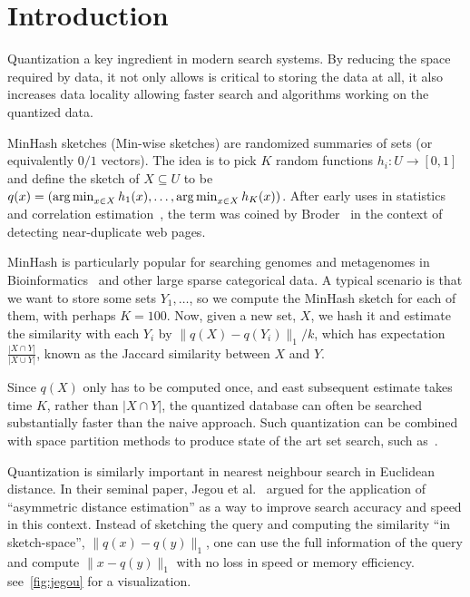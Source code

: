 
\section{Introduction}
Quantization a key ingredient in modern search systems.
By reducing the space required by data, it not only allows is critical to storing the data at all, it also increases data locality allowing faster search and algorithms working on the quantized data.

MinHash sketches (Min-wise sketches) are randomized summaries of sets (or equivalently $0/1$ vectors).
The idea is to pick $K$ random functions $h_i : U \to [0,1]$ and define the sketch of $X\subseteq U$ to be
$q(x) = (\operatorname*{arg\,min}_{x\in X}h_1(x), \dots, \operatorname*{arg\,min}_{x\in X}h_K(x))$.
After early uses in statistics~\cite{brewer1972selecting} and correlation estimation~\cite{flajolet1985probabilistic}, the term was coined by Broder~\cite{broder1997resemblance, broder1997syntactic} in the context of detecting near-duplicate web pages.

MinHash is particularly popular for searching genomes and metagenomes in Bioinformatics~\cite{ondov2016mash} and other large sparse categorical data.
A typical scenario is that we want to store some sets $Y_1, \dots$, so we compute the MinHash sketch for each of them, with perhaps $K=100$.
Now, given a new set, $X$, we hash it and estimate the similarity with each $Y_i$ by $\|q(X)-q(Y_i)\|_1/k$, which has expectation $\frac{|X\cap Y|}{|X\cup Y|}$, known as the Jaccard similarity between $X$ and $Y$.

Since $q(X)$ only has to be computed once, and east subsequent estimate takes time $K$, rather than $|X \cap Y|$, the quantized database can often be searched substantially faster than the naive approach.
Such quantization can be combined with space partition methods to produce state of the art set search, such as~\cite{christiani2018scalable}.

Quantization is similarly important in nearest neighbour search in Euclidean distance.
In their seminal paper, Jegou et al.~\cite{jegou2010product}
argued for the application of ``asymmetric distance estimation'' as a way to improve search accuracy and speed in this context.
Instead of sketching the query and computing the similarity ``in sketch-space'', $\|q(x)-q(y)\|_1$,
one can use the full information of the query and compute $\|x-q(y)\|_1$ with no loss in speed or memory efficiency.
see~\cref{fig:jegou} for a visualization.


